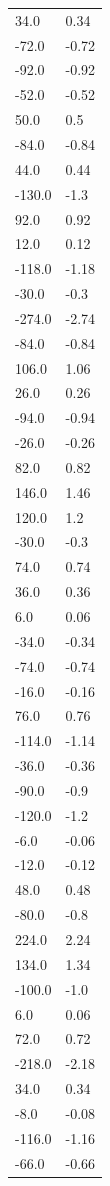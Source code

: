 \begin{longtable}{ll}
34.0 & 0.34 \\
-72.0 & -0.72 \\
-92.0 & -0.92 \\
-52.0 & -0.52 \\
50.0 & 0.5 \\
-84.0 & -0.84 \\
44.0 & 0.44 \\
-130.0 & -1.3 \\
92.0 & 0.92 \\
12.0 & 0.12 \\
-118.0 & -1.18 \\
-30.0 & -0.3 \\
-274.0 & -2.74 \\
-84.0 & -0.84 \\
106.0 & 1.06 \\
26.0 & 0.26 \\
-94.0 & -0.94 \\
-26.0 & -0.26 \\
82.0 & 0.82 \\
146.0 & 1.46 \\
120.0 & 1.2 \\
-30.0 & -0.3 \\
74.0 & 0.74 \\
36.0 & 0.36 \\
6.0 & 0.06 \\
-34.0 & -0.34 \\
-74.0 & -0.74 \\
-16.0 & -0.16 \\
76.0 & 0.76 \\
-114.0 & -1.14 \\
-36.0 & -0.36 \\
-90.0 & -0.9 \\
-120.0 & -1.2 \\
-6.0 & -0.06 \\
-12.0 & -0.12 \\
48.0 & 0.48 \\
-80.0 & -0.8 \\
224.0 & 2.24 \\
134.0 & 1.34 \\
-100.0 & -1.0 \\
6.0 & 0.06 \\
72.0 & 0.72 \\
-218.0 & -2.18 \\
34.0 & 0.34 \\
-8.0 & -0.08 \\
-116.0 & -1.16 \\
-66.0 & -0.66 \\

\end{longtable}
